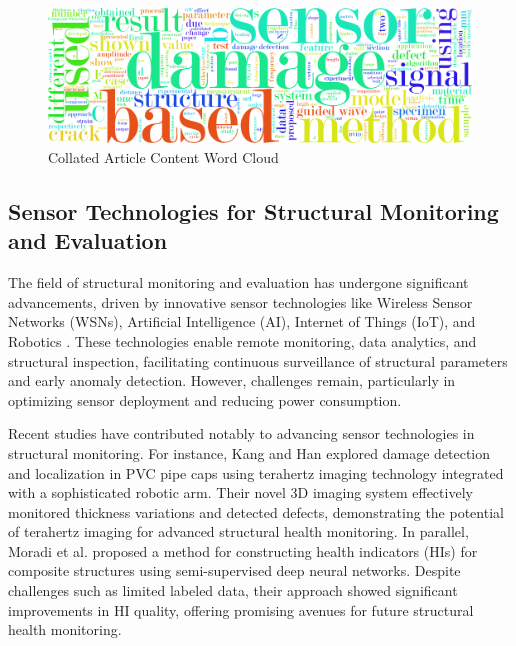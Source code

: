 \documentclass[journal, a4paper]{IEEEtran}
\begin{document}
\begin{figure}[h] %
  \centering
  \includegraphics[width=\textwidth]{./word_cloud/filtered/wordcloud.png}
  \caption{Collated Article Content Word Cloud}
  \label{fig:coOccuranceNetworkSHM}
\end{figure}



\subsection{Sensor Technologies for Structural Monitoring and Evaluation}
The field of structural monitoring and evaluation has undergone significant advancements, driven by innovative sensor technologies like Wireless Sensor Networks (WSNs), Artificial Intelligence (AI), Internet of Things (IoT), and Robotics \cite{yang_broadband_2023}\cite{ziaja_shm_2021}\cite{bevan_automated_2022}. These technologies enable remote monitoring, data analytics, and structural inspection, facilitating continuous surveillance of structural parameters and early anomaly detection. However, challenges remain, particularly in optimizing sensor deployment and reducing power consumption.

Recent studies have contributed notably to advancing sensor technologies in structural monitoring. For instance, Kang and Han \cite{kang_robotic-based_2021} explored damage detection and localization in PVC pipe caps using terahertz imaging technology integrated with a sophisticated robotic arm. Their novel 3D imaging system effectively monitored thickness variations and detected defects, demonstrating the potential of terahertz imaging for advanced structural health monitoring. In parallel, Moradi et al. \cite{moradi_intelligent_2023} proposed a method for constructing health indicators (HIs) for composite structures using semi-supervised deep neural networks. Despite challenges such as limited labeled data, their approach showed significant improvements in HI quality, offering promising avenues for future structural health monitoring.
\end{document}

